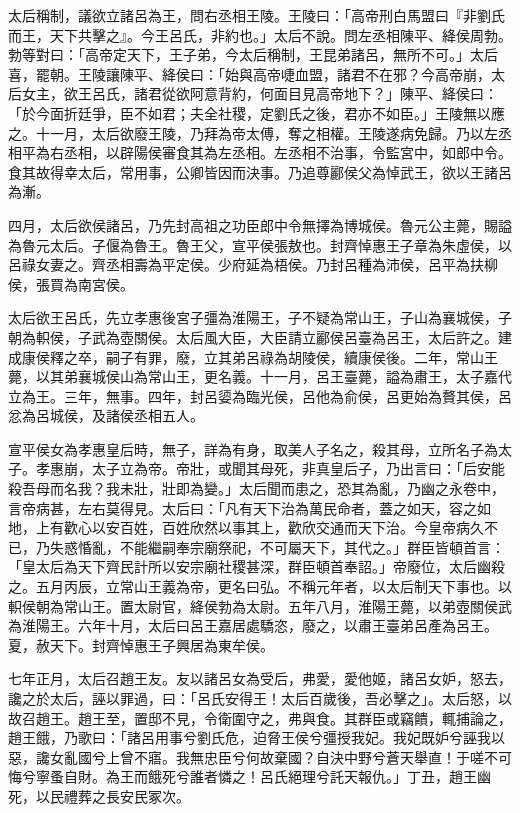 \begin{pinyinscope}
太后稱制，議欲立諸呂為王，問右丞相王陵。王陵曰：「高帝刑白馬盟曰『非劉氏而王，天下共擊之』。今王呂氏，非約也。」太后不說。問左丞相陳平、絳侯周勃。勃等對曰：「高帝定天下，王子弟，今太后稱制，王昆弟諸呂，無所不可。」太后喜，罷朝。王陵讓陳平、絳侯曰：「始與高帝啑血盟，諸君不在邪？今高帝崩，太后女主，欲王呂氏，諸君從欲阿意背約，何面目見高帝地下？」陳平、絳侯曰：「於今面折廷爭，臣不如君；夫全社稷，定劉氏之後，君亦不如臣。」王陵無以應之。十一月，太后欲廢王陵，乃拜為帝太傅，奪之相權。王陵遂病免歸。乃以左丞相平為右丞相，以辟陽侯審食其為左丞相。左丞相不治事，令監宮中，如郎中令。食其故得幸太后，常用事，公卿皆因而決事。乃追尊酈侯父為悼武王，欲以王諸呂為漸。

四月，太后欲侯諸呂，乃先封高祖之功臣郎中令無擇為博城侯。魯元公主薨，賜謚為魯元太后。子偃為魯王。魯王父，宣平侯張敖也。封齊悼惠王子章為朱虛侯，以呂祿女妻之。齊丞相壽為平定侯。少府延為梧侯。乃封呂種為沛侯，呂平為扶柳侯，張買為南宮侯。

太后欲王呂氏，先立孝惠後宮子彊為淮陽王，子不疑為常山王，子山為襄城侯，子朝為軹侯，子武為壺關侯。太后風大臣，大臣請立酈侯呂臺為呂王，太后許之。建成康侯釋之卒，嗣子有罪，廢，立其弟呂祿為胡陵侯，續康侯後。二年，常山王薨，以其弟襄城侯山為常山王，更名義。十一月，呂王臺薨，謚為肅王，太子嘉代立為王。三年，無事。四年，封呂媭為臨光侯，呂他為俞侯，呂更始為贅其侯，呂忿為呂城侯，及諸侯丞相五人。

宣平侯女為孝惠皇后時，無子，詳為有身，取美人子名之，殺其母，立所名子為太子。孝惠崩，太子立為帝。帝壯，或聞其母死，非真皇后子，乃出言曰：「后安能殺吾母而名我？我未壯，壯即為變。」太后聞而患之，恐其為亂，乃幽之永卷中，言帝病甚，左右莫得見。太后曰：「凡有天下治為萬民命者，蓋之如天，容之如地，上有歡心以安百姓，百姓欣然以事其上，歡欣交通而天下治。今皇帝病久不已，乃失惑惛亂，不能繼嗣奉宗廟祭祀，不可屬天下，其代之。」群臣皆頓首言：「皇太后為天下齊民計所以安宗廟社稷甚深，群臣頓首奉詔。」帝廢位，太后幽殺之。五月丙辰，立常山王義為帝，更名曰弘。不稱元年者，以太后制天下事也。以軹侯朝為常山王。置太尉官，絳侯勃為太尉。五年八月，淮陽王薨，以弟壺關侯武為淮陽王。六年十月，太后曰呂王嘉居處驕恣，廢之，以肅王臺弟呂產為呂王。夏，赦天下。封齊悼惠王子興居為東牟侯。

七年正月，太后召趙王友。友以諸呂女為受后，弗愛，愛他姬，諸呂女妒，怒去，讒之於太后，誣以罪過，曰：「呂氏安得王！太后百歲後，吾必擊之」。太后怒，以故召趙王。趙王至，置邸不見，令衛圍守之，弗與食。其群臣或竊饋，輒捕論之，趙王餓，乃歌曰：「諸呂用事兮劉氏危，迫脅王侯兮彊授我妃。我妃既妒兮誣我以惡，讒女亂國兮上曾不寤。我無忠臣兮何故棄國？自決中野兮蒼天舉直！于嗟不可悔兮寧蚤自財。為王而餓死兮誰者憐之！呂氏絕理兮託天報仇。」丁丑，趙王幽死，以民禮葬之長安民冢次。


\end{pinyinscope}
